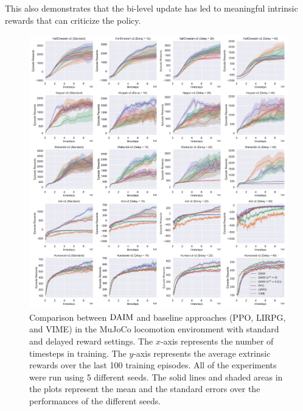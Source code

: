 This also demonstrates that the bi-level update has led to meaningful intrinsic {rewards} that can criticize the policy.
\begin{figure}[t!]
    \centering
    \includegraphics[width=1.0\linewidth]{figures/chapter5/mujoco_result_54_seaborn.pdf}
    \caption{Comparison between $\text{DAIM}$ and baseline approaches (PPO, LIRPG, and VIME) in the MuJoCo locomotion environment with standard and delayed reward settings. The $x$-axis represents the number of timesteps in training. The $y$-axis represents the average extrinsic rewards over the last 100 training episodes. All of the experiments were run using 5 different seeds. The solid lines and shaded areas in the plots represent the mean and the standard errors over the performances of the different seeds.}
    \label{fig:mujoco_results}
\end{figure}

